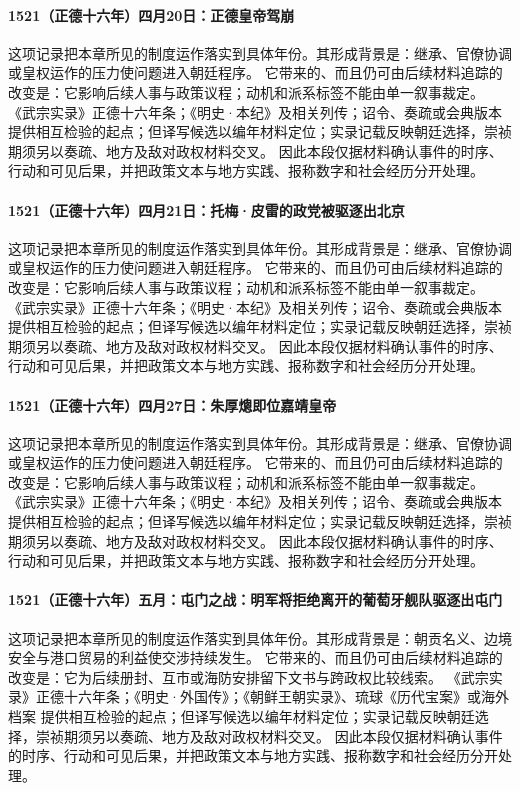 \paragraph{1521（正德十六年）四月20日：正德皇帝驾崩} 这项记录把本章所见的制度运作落实到具体年份。其形成背景是：继承、官僚协调或皇权运作的压力使问题进入朝廷程序。 它带来的、而且仍可由后续材料追踪的改变是：它影响后续人事与政策议程；动机和派系标签不能由单一叙事裁定。 《武宗实录》正德十六年条；《明史·本纪》及相关列传；诏令、奏疏或会典版本 提供相互检验的起点；但译写候选以编年材料定位；实录记载反映朝廷选择，崇祯期须另以奏疏、地方及敌对政权材料交叉。 因此本段仅据材料确认事件的时序、行动和可见后果，并把政策文本与地方实践、报称数字和社会经历分开处理。

\paragraph{1521（正德十六年）四月21日：托梅·皮雷的政党被驱逐出北京} 这项记录把本章所见的制度运作落实到具体年份。其形成背景是：继承、官僚协调或皇权运作的压力使问题进入朝廷程序。 它带来的、而且仍可由后续材料追踪的改变是：它影响后续人事与政策议程；动机和派系标签不能由单一叙事裁定。 《武宗实录》正德十六年条；《明史·本纪》及相关列传；诏令、奏疏或会典版本 提供相互检验的起点；但译写候选以编年材料定位；实录记载反映朝廷选择，崇祯期须另以奏疏、地方及敌对政权材料交叉。 因此本段仅据材料确认事件的时序、行动和可见后果，并把政策文本与地方实践、报称数字和社会经历分开处理。

\paragraph{1521（正德十六年）四月27日：朱厚熜即位嘉靖皇帝} 这项记录把本章所见的制度运作落实到具体年份。其形成背景是：继承、官僚协调或皇权运作的压力使问题进入朝廷程序。 它带来的、而且仍可由后续材料追踪的改变是：它影响后续人事与政策议程；动机和派系标签不能由单一叙事裁定。 《武宗实录》正德十六年条；《明史·本纪》及相关列传；诏令、奏疏或会典版本 提供相互检验的起点；但译写候选以编年材料定位；实录记载反映朝廷选择，崇祯期须另以奏疏、地方及敌对政权材料交叉。 因此本段仅据材料确认事件的时序、行动和可见后果，并把政策文本与地方实践、报称数字和社会经历分开处理。

\paragraph{1521（正德十六年）五月：屯门之战：明军将拒绝离开的葡萄牙舰队驱逐出屯门} 这项记录把本章所见的制度运作落实到具体年份。其形成背景是：朝贡名义、边境安全与港口贸易的利益使交涉持续发生。 它带来的、而且仍可由后续材料追踪的改变是：它为后续册封、互市或海防安排留下文书与跨政权比较线索。 《武宗实录》正德十六年条；《明史·外国传》；《朝鲜王朝实录》、琉球《历代宝案》或海外档案 提供相互检验的起点；但译写候选以编年材料定位；实录记载反映朝廷选择，崇祯期须另以奏疏、地方及敌对政权材料交叉。 因此本段仅据材料确认事件的时序、行动和可见后果，并把政策文本与地方实践、报称数字和社会经历分开处理。

